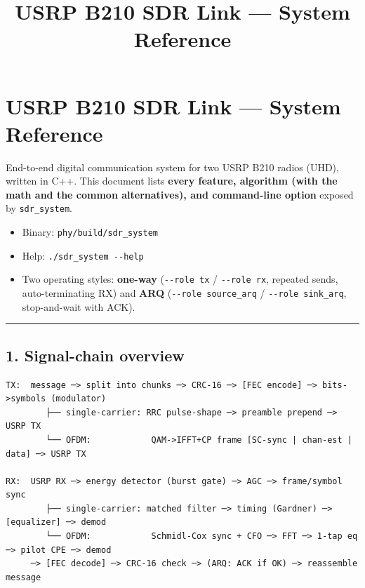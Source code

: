 \documentclass[
  10pt,
]{article}
\title{USRP B210 SDR Link — System Reference}
\author{}
\date{}
\providecommand{\tightlist}{%
  \setlength{\itemsep}{0pt}\setlength{\parskip}{0pt}}
\begin{document}
\maketitle

{
\hypersetup{linkcolor=}
\setcounter{tocdepth}{3}
\tableofcontents
}
\hypertarget{usrp-b210-sdr-link--system-reference}{%
\section{USRP B210 SDR Link --- System
Reference}\label{usrp-b210-sdr-link--system-reference}}

End-to-end digital communication system for two USRP B210 radios (UHD),
written in C++. This document lists \textbf{every feature, algorithm
(with the math and the common alternatives), and command-line option}
exposed by \texttt{sdr\_system}.

\begin{itemize}
\tightlist
\item
  Binary: \texttt{phy/build/sdr\_system}
\item
  Help: \texttt{./sdr\_system\ -\/-help}
\item
  Two operating styles: \textbf{one-way} (\texttt{-\/-role\ tx} /
  \texttt{-\/-role\ rx}, repeated sends, auto-terminating RX) and
  \textbf{ARQ} (\texttt{-\/-role\ source\_arq} /
  \texttt{-\/-role\ sink\_arq}, stop-and-wait with ACK).
\end{itemize}

\begin{center}\rule{0.5\linewidth}{0.5pt}\end{center}

\hypertarget{1-signal-chain-overview}{%
\subsection{1. Signal-chain overview}\label{1-signal-chain-overview}}

\begin{verbatim}
TX:  message ─> split into chunks ─> CRC-16 ─> [FEC encode] ─> bits->symbols (modulator)
        ├── single-carrier: RRC pulse-shape ─> preamble prepend ─> USRP TX
        └── OFDM:            QAM->IFFT+CP frame [SC-sync | chan-est | data] ─> USRP TX

RX:  USRP RX ─> energy detector (burst gate) ─> AGC ─> frame/symbol sync
        ├── single-carrier: matched filter ─> timing (Gardner) ─> [equalizer] ─> demod
        └── OFDM:            Schmidl-Cox sync + CFO ─> FFT ─> 1-tap eq ─> pilot CPE ─> demod
     ─> [FEC decode] ─> CRC-16 check ─> (ARQ: ACK if OK) ─> reassemble message
\end{verbatim}
\end{document}
